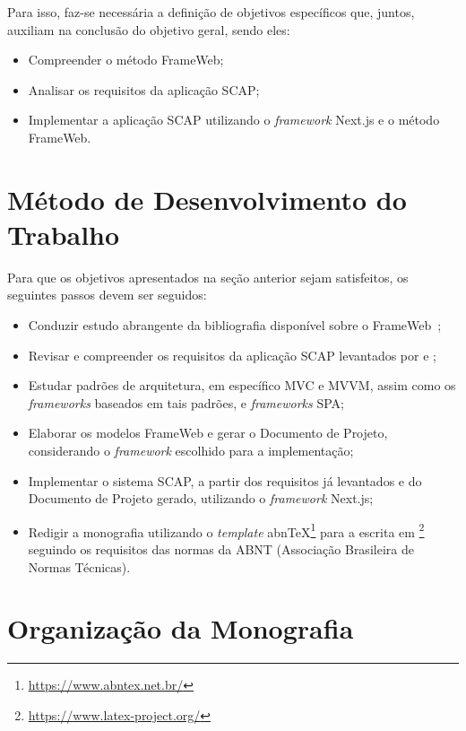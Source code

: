 Para isso, faz-se necessária a definição de objetivos específicos que, juntos, auxiliam na conclusão do objetivo geral, sendo eles:
\begin{itemize}
    \item Compreender o método FrameWeb;
    \item Analisar os requisitos da aplicação SCAP;
    \item Implementar a aplicação SCAP utilizando o \textit{framework} Next.js e o método FrameWeb.
\end{itemize}



\section{Método de Desenvolvimento do Trabalho}
\label{sec-intro-met}

Para que os objetivos apresentados na seção anterior sejam satisfeitos, os seguintes passos devem ser seguidos:

\begin{itemize}
    \item Conduzir estudo abrangente da bibliografia disponível sobre o FrameWeb~\cite{souza:2007,souza:2020};
    \item Revisar e compreender os requisitos da aplicação SCAP levantados por  e ;
    \item Estudar padrões de arquitetura, em específico MVC e MVVM, assim como os \textit{frameworks} baseados em tais padrões, e \textit{frameworks} SPA;
    \item Elaborar os modelos FrameWeb e gerar o Documento de Projeto, considerando o \textit{framework} escolhido para a implementação;
    \item Implementar o sistema SCAP, a partir dos requisitos já levantados e do Documento de Projeto gerado, utilizando o \textit{framework} Next.js;
    \item Redigir a monografia utilizando o \textit{template} abnTeX\footnote{\url{https://www.abntex.net.br/}} para a escrita em \latex\footnote{\url{https://www.latex-project.org/}} seguindo os requisitos das normas da ABNT (Associação Brasileira de Normas Técnicas).
\end{itemize}


\section{Organização da Monografia}
\label{sec-intro-organizacao}

